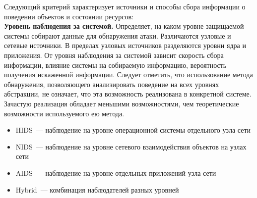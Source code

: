 Следующий критерий характеризует источники и способы сбора информации о поведении объектов и состоянии ресурсов:\\

\textbf{Уровень наблюдения за системой.} Определяет, на каком уровне защищаемой системы собирают данные для обнаружения атаки. Различаются узловые и сетевые источники. В пределах узловых источников разделяются уровни ядра и приложения. От уровня наблюдения за системой зависит скорость сбора информации, влияние системы на собираемую информацию, вероятность получения искаженной информации. Следует отметить, что использование метода обнаружения, позволяющего анализировать поведение на всех уровнях абстракции, не означает, что эта возможность реализована в конкретной системе. Зачастую реализация обладает меньшими возможностями, чем теоретические возможности используемого ею метода. 

\begin{itemize}

\item HIDS~--- наблюдение на уровне операционной системы отдельного узла сети
\item NIDS~--- наблюдение на уровне сетевого взаимодействия объектов на узлах сети
\item AIDS~--- наблюдение на уровне отдельных приложений узла сети
\item Hybrid~--- комбинация наблюдателей разных уровней

\end{itemize}

